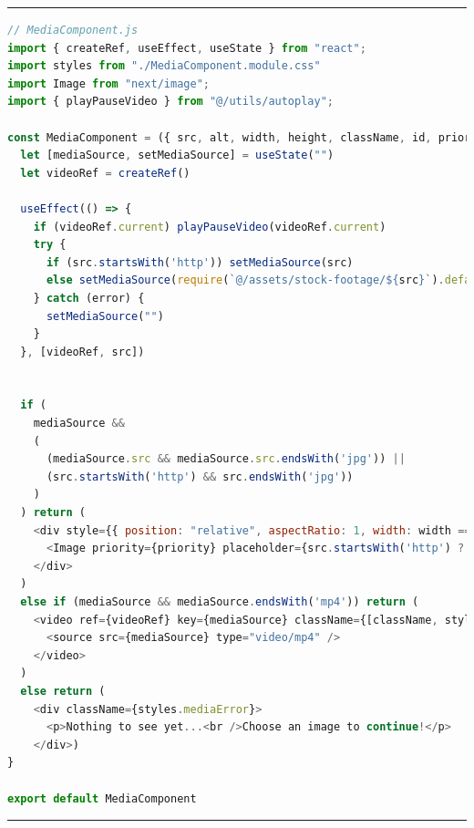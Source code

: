 \documentclass[a4paper, 12pt]{article}
\begin{document}
\vspace{0.5cm} \hrule \vspace{0.5cm}

\begin{lstlisting}[caption=MediaComponent in Next.js, label={lst:Next:MediaComponent}, language=JavaScript, escapechar=°]
// MediaComponent.js
import { createRef, useEffect, useState } from "react";
import styles from "./MediaComponent.module.css"
import Image from "next/image";
import { playPauseVideo } from "@/utils/autoplay";

const MediaComponent = ({ src, alt, width, height, className, id, priority = false }) => {
  let [mediaSource, setMediaSource] = useState("")
  let videoRef = createRef()

  useEffect(() => {
    if (videoRef.current) playPauseVideo(videoRef.current)
    try {
      if (src.startsWith('http')) setMediaSource(src)
      else setMediaSource(require(`@/assets/stock-footage/${src}`).default)°\label{line:Next:MediaComponent:imageImport}°
    } catch (error) {
      setMediaSource("")
    }
  }, [videoRef, src])


  if (
    mediaSource &&
    (
      (mediaSource.src && mediaSource.src.endsWith('jpg')) ||
      (src.startsWith('http') && src.endsWith('jpg'))
    )
  ) return (
    <div style={{ position: "relative", aspectRatio: 1, width: width == "100%" ? width : `${width}px`, overflow: "hidden" }} id={id} className={[className, styles.postMedia].join(" ")}>
      <Image priority={priority} placeholder={src.startsWith('http') ? "empty" : "blur"} quality={50} src={mediaSource} alt={alt} width={width.endsWith("%") ? 600 : width} height={height || (width.endsWith("%") ? 600 : width)} />
    </div>
  )
  else if (mediaSource && mediaSource.endsWith('mp4')) return (
    <video ref={videoRef} key={mediaSource} className={[className, styles.postMedia].join(" ")} id={id} width={width} preload="metadata" controls controlsList="nodownload,nofullscreen,noremoteplayback" disablePictureInPicture loop muted >
      <source src={mediaSource} type="video/mp4" />
    </video>
  )
  else return (
    <div className={styles.mediaError}>
      <p>Nothing to see yet...<br />Choose an image to continue!</p>
    </div>)
}

export default MediaComponent
\end{lstlisting}

\vspace{0.5cm} \hrule \vspace{0.5cm}
\end{document}

